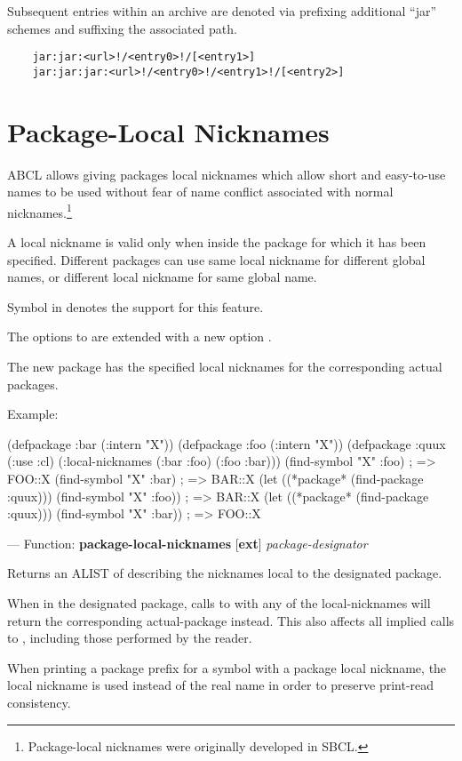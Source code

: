 \documentclass[10pt]{book}
\begin{document}
Subsequent entries within an archive are denoted via prefixing
additional ``jar'' schemes and suffixing the associated path.
\begin{verbatim}
    jar:jar:<url>!/<entry0>!/[<entry1>]
    jar:jar:jar:<url>!/<entry0>!/<entry1>!/[<entry2>]
\end{verbatim}


\section{Package-Local Nicknames}
\label{section:package-local-nicknames}

ABCL allows giving packages local nicknames which allow short and
easy-to-use names to be used without fear of name conflict associated
with normal nicknames.\footnote{Package-local nicknames were
originally developed in SBCL.}

A local nickname is valid only when inside the package for which it
has been specified. Different packages can use same local nickname for
different global names, or different local nickname for same global
name.

Symbol  in  denotes the
support for this feature.

The options to  are extended with a new option
.

The new package has the specified local nicknames for the corresponding
actual packages.

Example:
\begin{listing-lisp}
(defpackage :bar (:intern "X"))
(defpackage :foo (:intern "X"))
(defpackage :quux (:use :cl)
  (:local-nicknames (:bar :foo) (:foo :bar)))
(find-symbol "X" :foo) ; => FOO::X
(find-symbol "X" :bar) ; => BAR::X
(let ((*package* (find-package :quux)))
  (find-symbol "X" :foo))               ; => BAR::X
(let ((*package* (find-package :quux)))
  (find-symbol "X" :bar))               ; => FOO::X
\end{listing-lisp}

--- Function: \textbf{package-local-nicknames} [\textbf{ext}] \textit{package-designator}

\begin{adjustwidth}{5em}{5em}
  Returns an ALIST of 
  describing the nicknames local to the designated package.

  When in the designated package, calls to  with any
  of the local-nicknames will return the corresponding actual-package
  instead. This also affects all implied calls to ,
  including those performed by the reader.

  When printing a package prefix for a symbol with a package local
  nickname, the local nickname is used instead of the real name in order
  to preserve print-read consistency.
\end{adjustwidth}
\end{document}
